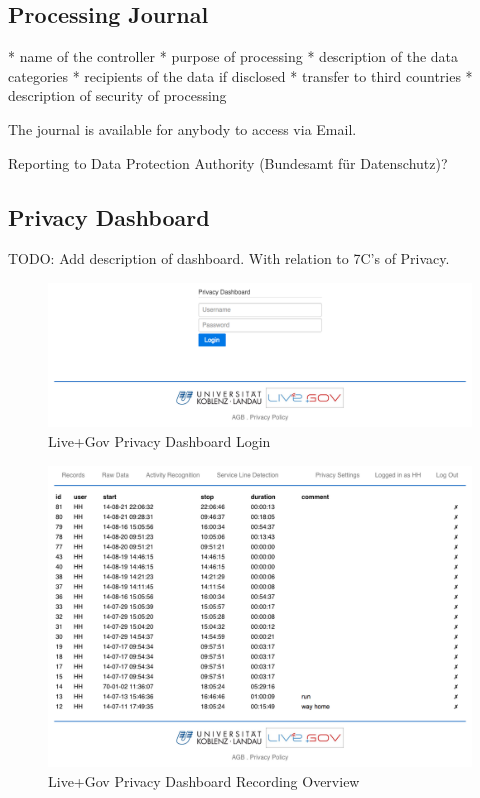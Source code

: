 \subsection{Processing Journal}
* name of the controller
* purpose of processing
* description of the data categories
* recipients of the data if disclosed
* transfer to third countries
* description of security of processing

The journal is available for anybody to access via Email.

Reporting to Data Protection Authority (Bundesamt für Datenschutz)?

\subsection{Privacy Dashboard}
TODO: Add description of dashboard. With relation to 7C's of Privacy.

\begin{figure}
\includegraphics[width=\textwidth]{screenshots/login.png}
\caption{Live+Gov Privacy Dashboard Login}
\end{figure}

\begin{figure}
\includegraphics[width=\textwidth]{screenshots/recordings.png}
\caption{Live+Gov Privacy Dashboard Recording Overview}
\end{figure}

